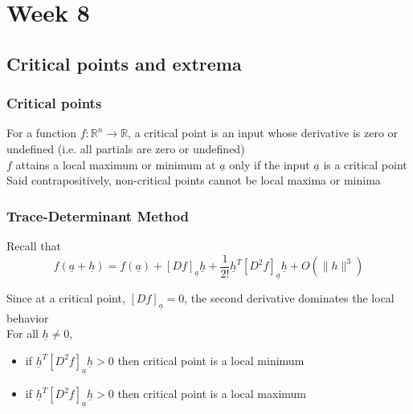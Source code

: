 \chapter{Week 8}

\section{Critical points and extrema}

\subsection{Critical points}
\begin{framed}
   For a function $f: \mathbb{R}^n \rightarrow \mathbb{R}$, a critical point is an input whose derivative is zero or undefined (i.e. all partials are zero or undefined) \\

   $f$ attains a local maximum or minimum at $ \underline{a}$ only if the input $ \underline{a}$ is a critical point \\

   Said contrapositively, non-critical points cannot be local maxima or minima
  
\end{framed}

\subsection{Trace-Determinant Method}

Recall that 
\[
  f( \underline{a} + \underline{h}) = f( \underline{a}) + \left[ D f \right]_{ \underline{a}} \underline{h} + \frac{1}{2!} \underline{h}^T \left[ D^2 f \right]_{ \underline{a}} \underline{h} + O( \lVert h \rVert^3)
\] 

Since at a critical point, $ \left[ D f \right]_{ \underline{a}} = 0 $, the second derivative dominates the local behavior \\

For all $ \underline{h} \neq 0$, 
\begin{itemize}
   \item if $ \underline{h}^T \left[ D^2 f \right]_{ \underline{a}} \underline{h} > 0$ then critical point is a local minimum 
   \item if $ \underline{h}^T \left[ D^2 f \right]_{ \underline{a}} \underline{h} > 0$ then critical point is a local maximum 
\end{itemize}

